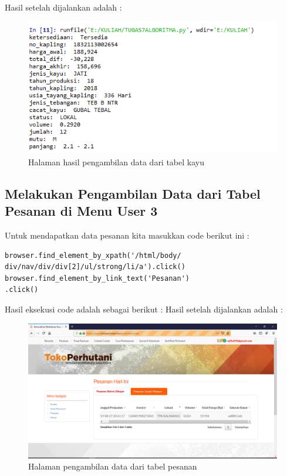 Hasil setelah dijalankan adalah :
\begin{figure}[h]
	\centering
	\includegraphics[scale=0.6]{figures/2tabelkayu}
	\caption{Halaman hasil pengambilan data dari tabel kayu}
\end{figure}

\newpage
\subsection{Melakukan Pengambilan Data dari Tabel Pesanan di Menu User 3}
Untuk mendapatkan data pesanan kita masukkan code berikut ini :
\begin{verbatim}
browser.find_element_by_xpath('/html/body/
div/nav/div/div[2]/ul/strong/li/a').click()
browser.find_element_by_link_text('Pesanan')
.click()
\end{verbatim}

Hasil eksekusi code adalah sebagai berikut :
Hasil setelah dijalankan adalah :
\begin{figure}[h]
	\centering
	\includegraphics[scale=0.25]{figures/1tabelpesanan}
	\caption{Halaman pengambilan data dari tabel pesanan}
\end{figure}

